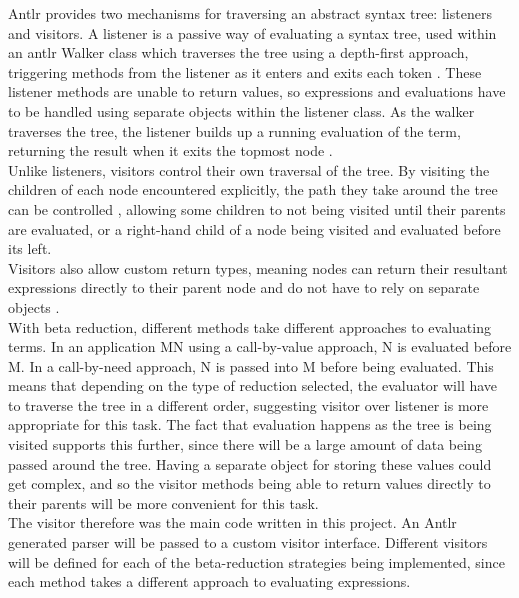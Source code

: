 \documentclass[a4paper,12pt]{report}
\begin{document}
Antlr provides two mechanisms for traversing an abstract syntax tree: listeners and visitors. A listener is a passive way of evaluating a syntax tree, used within an antlr Walker class which traverses the tree using a depth-first approach, triggering methods from the listener as it enters and exits each token \cite{Parr2012}. These listener methods are unable to return values, so expressions and evaluations have to be handled using separate objects within the listener class. As the walker traverses the tree, the listener builds up a running evaluation of the term, returning the result when it exits the topmost node \cite{Srivastav2017}.\\

Unlike listeners, visitors control their own traversal of the tree. By visiting the children of each node encountered explicitly, the path they take around the tree can be controlled \cite{Parr2012}, allowing some children to not being visited until their parents are evaluated, or a right-hand child of a node being visited and evaluated before its left.\\

Visitors also allow custom return types, meaning nodes can return their resultant expressions directly to their parent node and do not have to rely on separate objects \cite{Srivastav2017}.\\

With beta reduction, different methods take different approaches to evaluating terms. In an application MN using a call-by-value approach, N is evaluated before M. In a call-by-need approach, N is passed into M before being evaluated. This means that depending on the type of reduction selected, the evaluator will have to traverse the tree in a different order, suggesting visitor over listener is more appropriate for this task. The fact that evaluation happens as the tree is being visited supports this further, since there will be a large amount of data being passed around the tree. Having a separate object for storing these values could get complex, and so the visitor methods being able to return values directly to their parents will be more convenient for this task.\\

The visitor therefore was the main code written in this project. An Antlr generated parser will be passed to a custom visitor interface. Different visitors will be defined for each of the beta-reduction strategies being implemented, since each method takes a different approach to evaluating expressions.\\
\end{document}
